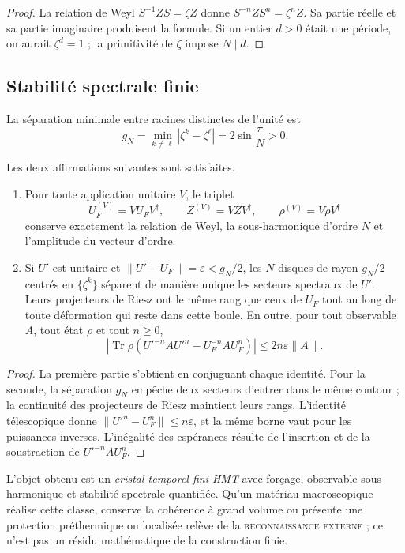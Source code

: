 \begin{proof}
La relation de Weyl \(S^{-1} Z S=\zeta Z\) donne
\(S^{-n} Z S^n=\zeta^n Z\). Sa partie réelle et sa partie imaginaire produisent la
formule. Si un entier \(d>0\) était une période, on aurait
\(\zeta^d=1\) ; la primitivité de \(\zeta\) impose \(N\mid d\).
\end{proof}

\subsection{Stabilité spectrale finie}

La séparation minimale entre racines distinctes de l’unité est
\[
 g_N=\min_{k\ne\ell}|\zeta^k-\zeta^\ell|
 =2\sin\frac{\pi}{N}>0.
\]

\begin{theorem}
\label{thm:hmtf2-estabilidad-cristal}
Les deux affirmations suivantes sont satisfaites.

\begin{enumerate}
 \item Pour toute application unitaire \(V\), le triplet
 \[
  U_F^{(V)}=V U_F V^\dagger,\qquad
  Z^{(V)}=V Z V^\dagger,\qquad
  \rho^{(V)}=V\rho V^\dagger
 \]
 conserve exactement la relation de Weyl, la sous-harmonique d’ordre \(N\) et
 l’amplitude du vecteur d’ordre.
 \item Si \(U'\) est unitaire et
 \(\|U'-U_F\|=\varepsilon<g_N/2\), les \(N\) disques de rayon
 \(g_N/2\) centrés en \(\{\zeta^k\}\) séparent de manière unique les secteurs
 spectraux de \(U'\). Leurs projecteurs de Riesz ont le même rang que
 ceux de \(U_F\) tout au long de toute déformation qui reste dans cette boule.
 En outre, pour tout observable \(A\), tout état \(\rho\) et tout \(n\geq0\),
 \[
 \left|
 \operatorname{Tr}\rho\left(U'^{-n}AU'^n-U_F^{-n}AU_F^n\right)
 \right|
 \leq 2n\varepsilon\|A\|.
 \]
\end{enumerate}
\end{theorem}

\begin{proof}
La première partie s’obtient en conjuguant chaque identité. Pour la seconde, la
séparation \(g_N\) empêche deux secteurs d’entrer dans le même contour ; la
continuité des projecteurs de Riesz maintient leurs rangs. L’identité
télescopique donne
\(\|U'^n-U_F^n\|\leq n\varepsilon\), et la même borne vaut pour les
puissances inverses. L’inégalité des espérances résulte de l’insertion et de la
soustraction de \(U'^{-n}AU_F^n\).
\end{proof}

L’objet obtenu est un \emph{cristal temporel fini HMT} avec forçage,
observable sous-harmonique et stabilité spectrale quantifiée. Qu’un matériau
macroscopique réalise cette classe, conserve la cohérence à grand volume ou
présente une protection préthermique ou localisée relève de la
\textsc{reconnaissance externe} ; ce n’est pas un résidu mathématique de la
construction finie.


